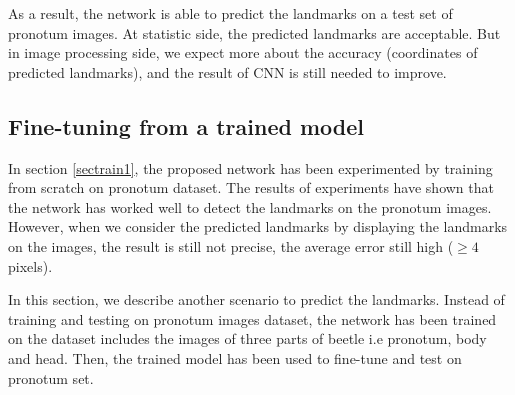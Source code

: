 \documentclass[10pt]{article}
\begin{document}


As a result, the network is able to predict the landmarks on a test set of pronotum images. At statistic side, the predicted landmarks are acceptable. But in image processing side, we expect more about the accuracy (coordinates of predicted landmarks), and the result of CNN is still needed to improve. 
\subsection{Fine-tuning from a trained model}
\label{secimproving}
In section \ref{sectrain1}, the proposed network has been experimented by training from scratch on pronotum dataset. The results of experiments have shown that the network has worked well to detect the landmarks on the pronotum images. However, when we consider the predicted landmarks by displaying the landmarks on the images, the result is still not precise, the average error still high ($\geq 4$ pixels). 

In this section, we describe another scenario to predict the landmarks. Instead of training and testing on pronotum images dataset, the network has been trained on the dataset includes the images of three parts of beetle i.e pronotum, body and head. Then, the trained model has been used to fine-tune and test on pronotum set.

\end{document}
